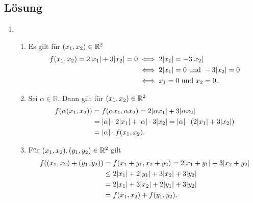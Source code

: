 \documentclass[german,12pt]{homework}
\newcommand{\RR}{\mathbb{R}}
\DeclarePairedDelimiter{\absolute}{\lvert}{\rvert}
\DeclarePairedDelimiter{\enbrace}{(}{)}
\begin{document}
    \subsection*{Lösung}
    \begin{enumerate}
        \item
        \begin{enumerate}[label=(N\arabic*)]
            \item Es gilt für \(\enbrace*{x_1, x_2} \in \RR^2\)
            \begin{align*}
                f\enbrace*{x_1, x_2} = 2\absolute*{x_1} + 3\absolute*{x_2} = 0
                &\iff 2\absolute*{x_1} = -3\absolute*{x_2}\\
                &\iff 2\absolute*{x_1} = 0\text{ und }-3\absolute*{x_2} = 0\\
                &\iff x_1 = 0\text{ und }x_2 = 0.
            \end{align*}
            \item Sei \(\alpha \in \RR\). Dann gilt für \(\enbrace*{x_1, x_2}
            \in \RR^2\)
            \begin{align*}
                f\enbrace*{\alpha\enbrace*{x_1, x_2}} &=
                f\enbrace*{\alpha{x_1}, \alpha{x_2}} = 2\absolute*{\alpha{x_1}}
                + 3\absolute*{\alpha{x_2}}\\
                &= \absolute*{\alpha} \cdot 2\absolute*{x_1} +
                \absolute*{\alpha} \cdot 3\absolute*{x_2} = \absolute*{\alpha}
                \cdot \enbrace*{2\absolute*{x_1} + 3\absolute*{x_2}}\\
                &= \absolute*{\alpha} \cdot f\enbrace*{x_1, x_2}.
            \end{align*}
            \item Für \(\enbrace*{x_1, x_2}, \enbrace*{y_1, y_2} \in \RR^2\)
            gilt
            \begin{align*}
                f\enbrace*{\enbrace*{x_1, x_2} + \enbrace*{y_1, y_2}} &=
                f\enbrace*{x_1 + y_1, x_2 + y_2} = 2\absolute*{x_1 + y_1} +
                3\absolute*{x_2 + y_2}\\
                &\le 2\absolute*{x_1} + 2\absolute*{y_1} + 3\absolute*{x_2} +
                3\absolute*{y_2}\\
                &= 2\absolute*{x_1} + 3\absolute*{x_2} + 2\absolute*{y_1} +
                3\absolute*{y_2}\\
                &= f\enbrace*{x_1, x_2} + f\enbrace*{y_1, y_2}.
            \end{align*}

\end{enumerate}
\end{enumerate}
\end{document}
